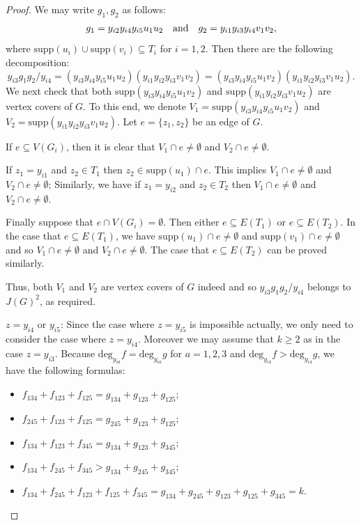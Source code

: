 \documentclass[sn-mathphys,Numbered]{sn-jnl}%
\theoremstyle{thmstyleone}%
\theoremstyle{thmstyletwo}%
\theoremstyle{thmstylethree}%
\begin{document}
\begin{proof}
 We  may write $g_1, g_2$ as follows: $$g_1=y_{i2}y_{i4}y_{i5}u_1u_2 \mbox{\quad and\quad }  g_2=y_{i1}y_{i3}y_{i4}v_1v_2,$$  where  $\mathrm{supp}(u_i)\cup \mathrm{supp}(v_i)\subseteq T_i$  for $i=1,2$. Then there are the following decomposition: $$y_{i3}g_1g_2/y_{i4}=(y_{i3}y_{i4}y_{i5}u_1u_2)(y_{i1}y_{i2}y_{i3}v_1v_2)=(y_{i3}y_{i4}y_{i5}u_1v_2)(y_{i1}y_{i2}y_{i3}v_1u_2).$$  We next check  that both $\mathrm{supp}(y_{i3}y_{i4}y_{i5}u_1v_2)$ and $\mathrm{supp}(y_{i1}y_{i2}y_{i3}v_1u_2)$ are vertex covers of $G$. To this end, we denote $V_1=\mathrm{supp}(y_{i3}y_{i4}y_{i5}u_1v_2)$ and $V_2=\mathrm{supp}(y_{i1}y_{i2}y_{i3}v_1u_2)$.  Let $e=\{z_1,z_2\}$ be an edge of $G$.

  If $e\subseteq V(G_i)$, then it is clear that $V_1\cap e\neq \emptyset$ and $V_2\cap e\neq \emptyset$.

  If $z_1=y_{i1}$ and $z_2\in T_1$ then $z_2\in \mathrm{supp}(u_1)\cap e$. This  implies $V_1\cap e\neq \emptyset$ and $V_2\cap e\neq \emptyset$; Similarly, we have if $z_1=y_{i2}$ and  $z_2\in T_2$ then $V_1\cap e\neq \emptyset$ and $V_2\cap e\neq \emptyset$.


 Finally  suppose that $e\cap V(G_i)=\emptyset$. Then either $e\subseteq  E(T_1)$ or $e\subseteq E(T_2)$. In the case that $e\subseteq  E(T_1)$, we have $\mathrm{supp}{(u_1)}\cap e\neq \emptyset$ and $\mathrm{supp}{(v_1)}\cap e\neq \emptyset$  and so  $V_1\cap e\neq \emptyset$ and $V_2\cap e\neq \emptyset$. The case that $e\subseteq  E(T_2)$ can be proved similarly.

 Thus, both $V_1$ and $V_2$ are vertex covers of $G$ indeed and so $y_{i3}g_1g_2/y_{i4}$ belongs to $J(G)^2$, as required.
 \vspace{2mm}











  $z=y_{i4}\mbox{ or } y_{i5}$:  Since the case where $z=y_{i5}$ is impossible actually, we only need to consider the case where  $z=y_{i4}$. Moreover we may assume that $k\geq2$ as in the  case $z=y_{i3}$.  Because  $\mathrm{deg}_{y_{ia}}f=\mathrm{deg}_{y_{ia}}g$ for $a=1,2,3$  and $\mathrm{deg}_{y_{i4}}f>\mathrm{deg}_{y_{i4}}g$,  we have the following formulas:
\begin{itemize}\item $f_{134}+f_{123}+f_{125}=g_{134}+g_{123}+g_{125}$;    \hfill{}
 \item $f_{245}+f_{123}+f_{125}=g_{245}+g_{123}+g_{125};$ \hfill{}
 \item $f_{134}+f_{123}+f_{345}=g_{134}+g_{123}+g_{345};$  \hfill{}
 \item $f_{134}+f_{245}+f_{345}>g_{134}+g_{245}+g_{345};$  \hfill{}
 \item $f_{134}+f_{245}+f_{123}+f_{125}+f_{345}=g_{134}+g_{245}+g_{123}+g_{125}+g_{345}=k.$ \hfill{}


\end{itemize}
\end{proof}
\end{document}
